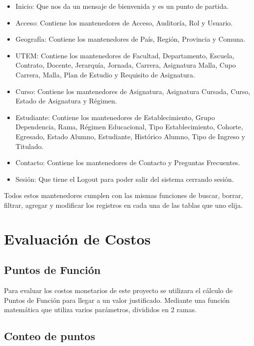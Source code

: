 \documentclass[a4paper,12pt,openany,oneside]{book}
\begin{document}
\begin{itemize}
	\item Inicio: Que nos da un mensaje de bienvenida y es un punto de partida.
	\item Acceso: Contiene los mantenedores de Acceso, Auditoría, Rol y Usuario.
	\item Geografía: Contiene los mantenedores de País, Región, Provincia y Comuna.
	\item UTEM: Contiene los mantenedores de Facultad, Departamento, Escuela, Contrato, Docente, Jerarquía, Jornada, Carrera, Asignatura Malla, Cupo Carrera, Malla, Plan de Estudio y Requisito de Asignatura.
	\item Curso: Contiene los mantenedores de Asignatura, Asignatura Cursada, Curso, Estado de Asignatura y Régimen.
	\item Estudiante: Contiene los mantenedores de Establecimiento, Grupo Dependencia, Rama, Régimen Educacional, Tipo Establecimiento, Cohorte, Egresado, Estado Alumno, Estudiante, Histórico Alumno, Tipo de Ingreso y Titulado.
	\item Contacto: Contiene los mantenedores de Contacto y Preguntas Frecuentes.
	\item Sesión: Que tiene el Logout para poder salir del sistema cerrando sesión.
\end{itemize}

Todos estos mantenedores cumplen con las mismas funciones de buscar, borrar, filtrar, agregar y modificar los registros en cada una de las tablas que uno elija.
\chapter{Evaluación de Costos}
\section{Puntos de Función}
Para evaluar los costos monetarios de este proyecto se utilizara el cálculo de Puntos de Función para llegar a un valor justificado. Mediante una función matemática que utiliza varios parámetros, divididos en 2 ramas.

\section{Conteo de puntos}
\end{document}
